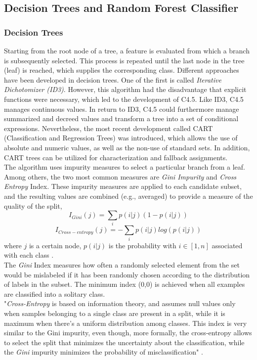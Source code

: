 \documentclass[a4paper, 11pt,titlepage,oneside,openany]{book}
\begin{document}
\subsection{Decision Trees and Random Forest Classifier}
\subsubsection{Decision Trees}
Starting from the root node of a tree, a feature is evaluated from which a branch is subsequently selected. This process is repeated until the last node in the tree (leaf) is reached, which supplies the corresponding class. Different approaches have been developed in decision trees. One of the first is called \textit{Iterative Dichotomizer (ID3)}. However, this algorithm had the disadvantage that explicit functions were necessary, which led to the development of C4.5. Like ID3, C4.5 manages continuous values. In return to ID3, C4.5 could furthermore manage summarized and decreed values and transform a tree into a set of conditional expressions. Nevertheless, the most recent development called CART (Classification and Regression Trees) was introduced, which allows the use of absolute and numeric values, as well as the non-use of standard sets. In addition, CART trees can be utilized for characterization and fallback assignments. \cite{algorithms2}\\
\noindent The algorithm uses impurity measures to select a particular branch from a leaf. Among others, the two most common measures are \textit{Gini Impurity} and \textit{Cross Entropy} Index. 
\newpage
\noindent These impurity measures are  applied to each candidate subset, and the resulting values are combined (e.g., averaged) to provide a measure of the quality of the split,
\[
I_{Gini}(j)=\sum_{i}p(i|j)(1-p(i|j))
\]
\[
I_{Cross-entropy}(j)=-\sum_{i}p(i|j)log(p(i|j))
\]
where $j$ is a certain node, $p(i|j)$ is the probability with $i \in [1,n]$ associated with each class \cite{algorithms}.\\
\noindent The \textit{Gini} Index measures how often a randomly selected element from the set would be mislabeled if it has been randomly chosen according to the distribution of labels in the subset. The minimum index (0,0) is achieved when all examples are classified into a solitary class.\\
\noindent "\textit{Cross-Entropy} is based on information theory, and assumes null values only when samples belonging to a single class are present in a split, while it is maximum when there's a uniform distribution among classes. This index is very similar to the Gini impurity, even though, more formally, the cross-entropy allows to select the split that minimizes the uncertainty about the classification, while the \textit{Gini} impurity minimizes the probability of misclassification" \cite{algorithms}.
\end{document}

